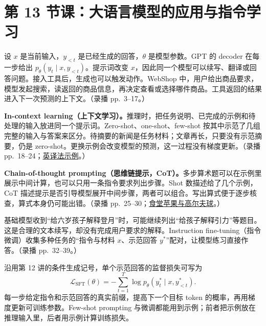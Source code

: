 \begingroup
\linespread{1.15}\selectfont
\setlength{\parskip}{0.4em}
\renewcommand{\recordid}[1]{}
\renewcommand{\relatedexercise}[2]{\hyperref[exercise:#1]{#2}}
\section{第 13 节课：大语言模型的应用与指令学习}
\label{lecture:SC4002-L13}


设 $x$ 是当前输入，$y_{<t}$ 是已经生成的回答，$\theta$ 是模型参数。GPT 的 decoder 在每一步给出 $p_\theta(y_t\mid x,y_{<t})$。提示词改变 $x$，因此同一个模型可以续写、翻译或回答问题。接入工具后，生成也可以触发动作。WebShop 中，用户给出商品要求，模型发起搜索，读返回的商品信息，再决定查看或选择哪件商品。工具返回的结果进入下一次预测的上下文。（录播 pp.~3--17。）

\textbf{In-context learning（上下文学习）。}推理时，把任务说明、已完成的示例和待处理的输入放进同一个提示词。Zero-shot、one-shot、few-shot 按其中示范了几组完整的输入与答案来区分。待摘要的新闻是任务材料；文章再长，只要没有示范摘要，仍是 zero-shot。更换示例会改变模型的预测，这一过程没有梯度更新。（录播 pp.~18--24；\relatedexercise{SC4002-L13-E01}{英译法示例}。）

\textbf{Chain-of-thought prompting（思维链提示，CoT）。}多步算术题可以在示例里展示中间计算，也可以只用一条指令要求列出步骤。Shot 数描述给了几个示例，CoT 描述提示是否引导模型展开中间步骤，两者可以组合。写出算式便于逐步核查，算式本身仍可能出错。（录播 pp.~25--30；\relatedexercise{SC4002-L13-E02}{食堂苹果与高尔夫球}。）

基础模型收到“给六岁孩子解释登月”时，可能继续列出“给孩子解释引力”等题目。这是合理的文本续写，却没有完成用户要求的解释。Instruction fine-tuning（指令微调）收集多种任务的“指令与材料 $x$、示范回答 $y^*$”配对，让模型练习直接作答。（录播 pp.~32--39。）

沿用第 12 讲的条件生成记号，单个示范回答的监督损失可写为
\[
  \mathcal L_{\mathrm{SFT}}(\theta)
    =-\sum_{t=1}^{T}\log p_\theta(y_t^*\mid x,y^*_{<t}).
\]
每一步给定指令和示范回答的真实前缀，提高下一个目标 token 的概率，再用梯度更新可训练参数。Few-shot prompting 与微调都能用到示例；前者把示例放在推理输入里，后者用示例计算训练损失。


